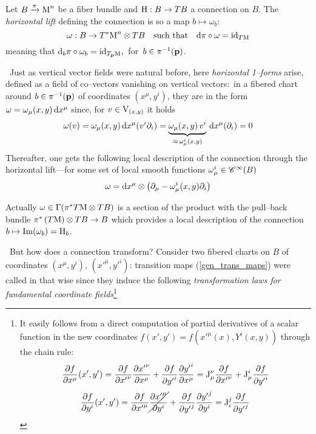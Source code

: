 \begin{defi}\label{hor_lift}
    Let $B\xrightarrow{\pi}\text{\normalfont M}^n$ be a fiber bundle and $\text{\normalfont H}:B\to TB$ a connection on $B$. The \emph{horizontal lift} defining the connection is so a map $b\mapsto\omega_b:$
    $$\omega:B\to T^*\text{\normalfont M}^n\otimes TB\quad\text{such that}\quad\text{\normalfont d}\pi\circ\omega=\text{\normalfont id}_{T\text{\normalfont M}}$$
    meaning that $\text{\normalfont d}_b\pi\circ\omega_b=\text{\normalfont id}_{T_{\mathbf{p}}\text{\normalfont M}},\,$ for $\,b\in\pi^{-1}(\mathbf{p})$.
\end{defi}
\,\newline
Just as vertical vector fields were natural before, here \emph{horizontal 1--forms} arise, defined as a field of co--vectors vanishing on vertical vectors:\, in a fibered chart around $b\in\pi^{-1}(\mathbf{p})$ of coordinates $(x^\mu,y^i)$, they are in the form $\omega=\omega_\mu(x,y)\,\text{\normalfont d} x^\mu$ since, for $v\in\text{\normalfont V}_{(x,y)}$ it holds
$$\omega(v)=\omega_\mu(x,y)\,\text{\normalfont d} x^\mu(v^i\partial_i)=\underbrace{\omega_\mu(x,y)\,v^i}_{\approx\,\omega^i_\mu(x,y)}\,\text{\normalfont d} x^\mu(\partial_i)=0$$
Thereafter, one gets the following local description of the connection through the horizontal lift---for some set of local smooth functions $\omega^i_\mu\in\mathscr{C}^\infty(B)$
\begin{equation}\label{general_connection}
    \omega=\text{\normalfont d} x^\mu\otimes\left(\partial_\mu-\omega^i_\mu(x,y)\partial_i\right)
\end{equation}

\begin{remark}
    Actually $\omega\in\Gamma(\pi^*T\text{\normalfont M}\otimes TB)$ is a section of the product with the pull--back bundle
$\pi^*\left(T\text{\normalfont M}\right)\otimes TB\to B$ which provides a local description of the connection $b\mapsto\Im(\omega_b)=\text{\normalfont H}_b$.
\end{remark} 

 \,\newline
But how does a connection transform? Consider two fibered charts on $B$ of coordinates $(x^\mu,y^i),\,({x'}^\mu,{y'}^i)$: transition maps (\ref{gen_trans_maps}) were called in that wise since they induce the following \emph{transformation laws for fundamental coordinate fields}\footnote{
    {It easily follows from a direct computation of partial derivatives of a scalar function in the new coordinates $f(x',y')=f\left({x'}^\mu(x),Y^i(x,y)\right)$ through the chain rule:
    $$\frac{\partial f}{\partial x^\mu}(x',y')=\frac{\partial f}{\partial{x'}^\nu}\frac{\partial{x'}^\nu}{\partial x^\mu}+\frac{\partial f}{\partial{y'}^i}\frac{\partial{y'}^i}{\partial x^\mu}=\text{\normalfont J}^\nu_\mu\frac{\partial f}{\partial{x'}^\nu}+\text{\normalfont J}^i_\mu\frac{\partial f}{\partial{y'}^i}$$
    $$\frac{\partial f}{\partial y^i}(x',y')=\frac{\partial f}{\partial{x'}^\mu}\cancel{\frac{\partial{x'}^\mu}{\partial y^i}}+\frac{\partial f}{\partial{y'}^j}\frac{\partial{y'}^j}{\partial y^i}=\text{\normalfont J}^j_i\frac{\partial f}{\partial{y'}^j}$$}}
    
